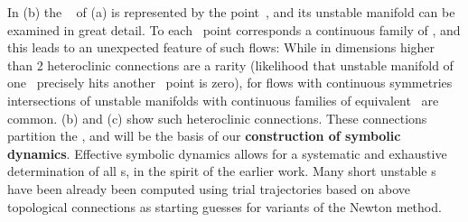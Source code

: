 In (b) the \eqv~ of
(a) is represented by the point~,
and its unstable manifold can be examined in great detail.
To each \eqv\ point corresponds a continuous family
of \eqva, and this leads to an unexpected feature of such
flows: While in dimensions higher than 2 heteroclinic connections 
are a rarity (likelihood that unstable manifold of one
 \eqv\ precisely hits another \eqv\ point is zero), 
for flows with continuous symmetries intersections of unstable
manifolds with continuous families of equivalent \eqva\ are common.
(b) and (c) show 
such heteroclinic connections.
These connections partition the \statesp,
and will be the basis of our
{\bf construction of symbolic dynamics}.
Effective symbolic dynamics allows
for a systematic and exhaustive determination 
of all \rpo s, in the spirit of 
the earlier work. 
Many short unstable \rpo s have been already 
been computed using trial trajectories based on above
topological connections as starting  guesses 
for variants of the Newton method.


